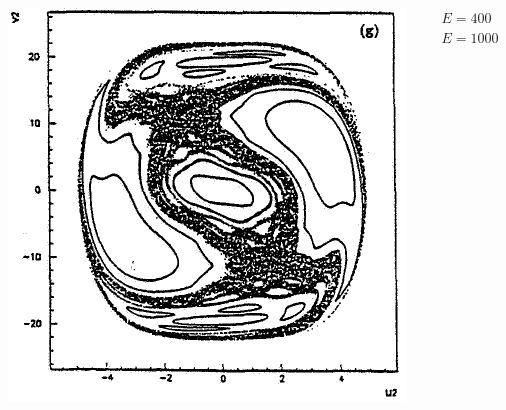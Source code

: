 \documentclass[a4,compress]{beamer}
\begin{document}
\begin{frame}
\begin{columns}[c]
\begin{column}{0.35\textwidth}
    \includegraphics[height=0.45\textheight]{ponicare-sections-e_1000}
  \end{column}
  \begin{column}{0.15\textwidth}
    \small \centering \(E = 400\) \\
    \vspace{3cm}
    \(E = 1000\)
  \end{column}
  \end{columns}
\end{frame}

\end{document}
